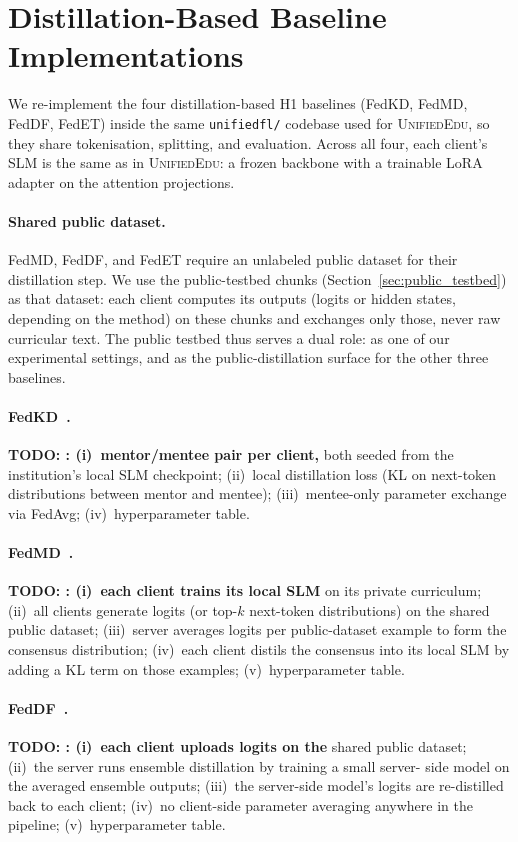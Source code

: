 \documentclass[11pt]{article}
\theoremstyle{plain}
\theoremstyle{definition}
\theoremstyle{remark}
\newcommand{\red}[1]{\textcolor{myred}{\textbf{#1}}}
\newcommand{\UniEdu}{\textsc{UnifiedEdu}}
\begin{document}
\section{Distillation-Based Baseline Implementations}
\label{app:baseline_implementations}

We re-implement the four distillation-based H1
baselines (FedKD, FedMD, FedDF, FedET) inside the
same \texttt{unifiedfl/} codebase used for
\UniEdu{}, so they share tokenisation, splitting,
and evaluation. Across all four, each client's
SLM is the same as in \UniEdu{}: a frozen backbone
with a trainable LoRA adapter on the attention
projections.

\paragraph{Shared public dataset.}
FedMD, FedDF, and FedET require an unlabeled
public dataset for their distillation step. We use
the public-testbed chunks
(Section~\ref{sec:public_testbed}) as that dataset: each
client computes its outputs (logits or hidden
states, depending on the method) on these chunks
and exchanges only those, never raw curricular
text. The public testbed thus serves a dual role:
as one of our experimental settings, and as the
public-distillation surface for the other three
baselines.

\paragraph{FedKD~\citep{wu2022fedkd}.}
\red{TODO: : (i)~mentor/mentee pair per client,}
both seeded from the institution's local SLM
checkpoint; (ii)~local distillation loss (KL on
next-token distributions between mentor and mentee);
(iii)~mentee-only parameter exchange via FedAvg;
(iv)~hyperparameter table.

\paragraph{FedMD~\citep{li2019fedmd}.}
\red{TODO: : (i)~each client trains its local SLM}
on its private curriculum; (ii)~all clients
generate logits (or top-$k$ next-token
distributions) on the shared public dataset;
(iii)~server averages logits per public-dataset
example to form the consensus distribution;
(iv)~each client distils the consensus into its
local SLM by adding a KL term on those examples;
(v)~hyperparameter table.

\paragraph{FedDF~\citep{lin2020feddf}.}
\red{TODO: : (i)~each client uploads logits on the}
shared public dataset; (ii)~the server runs
ensemble distillation by training a small server-
side model on the averaged ensemble outputs;
(iii)~the server-side model's logits are
re-distilled back to each client; (iv)~no
client-side parameter averaging anywhere in the
pipeline; (v)~hyperparameter table.
\end{document}
